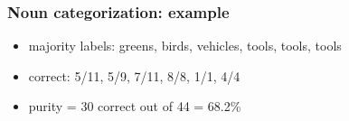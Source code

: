 \begin{frame}
\frametitle{Noun categorization: example}
\ungap[1]
\begin{center}
\end{center}
\ungap[1]
\begin{itemize}
\item<3-> majority labels: greens, birds, vehicles, tools, tools, tools
\item<3-> correct: 5/11, 5/9, 7/11, 8/8, 1/1, 4/4
\item<4-> purity = 30 correct out of 44 = 68.2\%
\end{itemize}

\end{frame}


